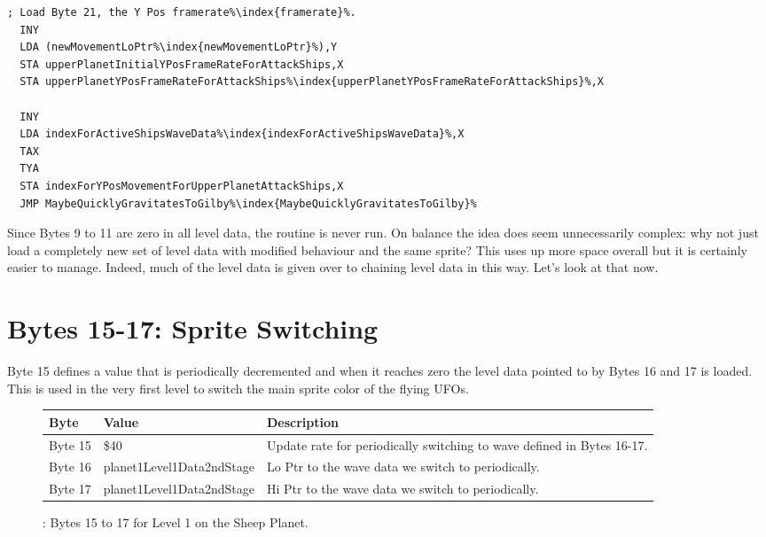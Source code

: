 \begin{lstlisting}[escapechar=\%]
  ; Load Byte 21, the Y Pos framerate%\index{framerate}%.
  INY
  LDA (newMovementLoPtr%\index{newMovementLoPtr}%),Y
  STA upperPlanetInitialYPosFrameRateForAttackShips,X
  STA upperPlanetYPosFrameRateForAttackShips%\index{upperPlanetYPosFrameRateForAttackShips}%,X

  INY
  LDA indexForActiveShipsWaveData%\index{indexForActiveShipsWaveData}%,X
  TAX
  TYA
  STA indexForYPosMovementForUpperPlanetAttackShips,X
  JMP MaybeQuicklyGravitatesToGilby%\index{MaybeQuicklyGravitatesToGilby}%
\end{lstlisting}

Since Bytes 9 to 11 are zero in all level data, the routine is never run. On balance the idea does seem
unnecessarily complex: why not just load a completely new set of level data with modified behaviour and
the same sprite? This uses up more space overall but it is certainly easier to manage. Indeed, much
of the level data is given over to chaining level data in this way. Let's look at that now.


\section{Bytes 15-17: Sprite Switching}
Byte 15 defines a value that is periodically decremented and when it reaches zero the level data pointed
to by Bytes 16 and 17 is loaded. This is used in the very first level to switch the main sprite color
of the flying UFOs. 

\begin{figure}[H]

  {
    \setlength{\tabcolsep}{3.0pt}
    \setlength\cmidrulewidth{\heavyrulewidth} %
    \begin{adjustbox}{width=13cm}

      \begin{tabular}{lll}
        \toprule
        Byte    & Value                     & Description                                                        \\
        \midrule
Byte 15 & \$40                       & Update rate for periodically switching to wave defined in Bytes 16-17. \\
 Byte 16 & planet1Level1Data2ndStage\index{planet1Level1Data2ndStage} & Lo Ptr to the wave data we switch to periodically.               \\
 Byte 17 & planet1Level1Data2ndStage\index{planet1Level1Data2ndStage} & Hi Ptr to the wave data we switch to periodically.               \\
        \bottomrule
      \end{tabular}
    \end{adjustbox}
  }\caption{: Bytes 15 to 17 for Level 1 on the Sheep Planet.}
\end{figure}

